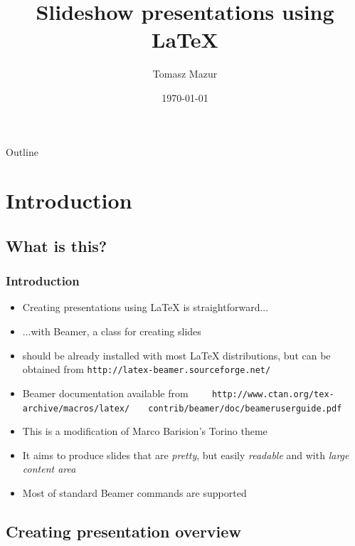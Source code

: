 \documentclass[xcolor=pdftex,t,11pt]{beamer}
\author{Tomasz Mazur}
\title{Slideshow presentations using \LaTeX{}}
\institute{Oxford University}
\date{\today}
\begin{document}

\begin{frame}[plain]
	\titlepage
\end{frame}

\begin{frame}{Outline}
	\tableofcontents
\end{frame}


\section{Introduction}


\subsection{What is this?}

\begin{frame}[fragile]
\frametitle{Introduction}
\begin{itemize}
\item \alert{Creating presentations using \LaTeX{} is straightforward...}
\item ...with Beamer, a class for creating slides
\item should be already installed with most \LaTeX{} distributions, but can be obtained from \verb!http://latex-beamer.sourceforge.net/!
\item Beamer documentation available from \verb!	http://www.ctan.org/tex-archive/macros/latex/! \verb!	contrib/beamer/doc/beameruserguide.pdf!
\item This is a modification of Marco Barision's Torino theme 
\item It aims to produce slides that are \emph{pretty}, but easily \emph{readable} and with \emph{large content area}
\item Most of standard Beamer commands are supported
\end{itemize}
\end{frame}

\subsection{Creating presentation overview}
\end{document}
